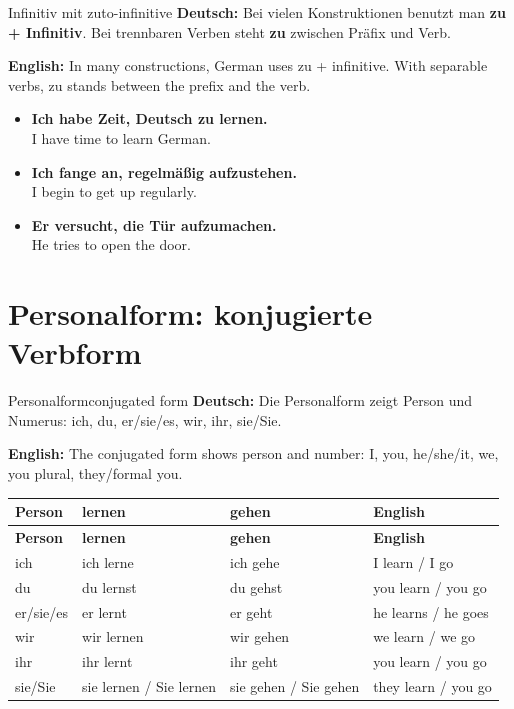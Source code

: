 \documentclass[a4paper,11pt]{article}
\newcommand{\GermanText}[1]{\textbf{Deutsch: }#1\par}
\newcommand{\EnglishText}[1]{{\small\color{SoftGray}\textbf{English: }#1\par}}
\newcommand{\ExampleItem}[2]{\item \textbf{#1}\\{\small\color{SoftGray}#2}}
\begin{document}
\begin{grammarentry}{Infinitiv mit zu}{to-infinitive}
\GermanText{Bei vielen Konstruktionen benutzt man \textbf{zu + Infinitiv}. Bei trennbaren Verben steht \textbf{zu} zwischen Präfix und Verb.}
\EnglishText{In many constructions, German uses zu + infinitive. With separable verbs, zu stands between the prefix and the verb.}

\begin{exbox}
\begin{itemize}
    \ExampleItem{Ich habe Zeit, Deutsch zu lernen.}{I have time to learn German.}
    \ExampleItem{Ich fange an, regelmäßig aufzustehen.}{I begin to get up regularly.}
    \ExampleItem{Er versucht, die Tür aufzumachen.}{He tries to open the door.}
\end{itemize}
\end{exbox}
\end{grammarentry}

\section{Personalform: konjugierte Verbform}

\begin{grammarentry}{Personalform}{conjugated form}
\GermanText{Die Personalform zeigt Person und Numerus: ich, du, er/sie/es, wir, ihr, sie/Sie.}
\EnglishText{The conjugated form shows person and number: I, you, he/she/it, we, you plural, they/formal you.}
\end{grammarentry}

\begin{longtable}{L{3cm}L{4.5cm}L{4.5cm}L{4cm}}
\color{white}\textbf{Person} & \color{white}\textbf{lernen} & \color{white}\textbf{gehen} & \color{white}\textbf{English} \\
\endfirsthead
{}
\color{white}\textbf{Person} & \color{white}\textbf{lernen} & \color{white}\textbf{gehen} & \color{white}\textbf{English} \\
\endhead
ich & ich lerne & ich gehe & I learn / I go \\
du & du lernst & du gehst & you learn / you go \\
er/sie/es & er lernt & er geht & he learns / he goes \\
wir & wir lernen & wir gehen & we learn / we go \\
ihr & ihr lernt & ihr geht & you learn / you go \\
sie/Sie & sie lernen / Sie lernen & sie gehen / Sie gehen & they learn / you go \\
\end{longtable}
\end{document}
